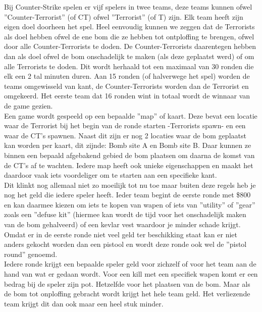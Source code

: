 \documentclass[pdftex,a4paper,12pt,twoside]{report}
\begin{document}
Bij Counter-Strike spelen er vijf spelers in twee teams, deze teams kunnen ofwel ''Counter-Terrorist'' (of CT) ofwel ''Terrorist'' (of T) zijn. Elk team heeft zijn eigen doel doorheen het spel. Heel eenvoudig kunnen we zeggen dat de Terrorists als doel hebben ofwel de ene bom die ze hebben tot ontploffing te brengen, ofwel door alle Counter-Terrorists te doden. 
De Counter-Terrorists daarentegen hebben dan als doel ofwel de bom onschadelijk te maken (als deze geplaatst werd) of om alle Terrorists te doden. Dit wordt herhaald tot een maximaal van 30 ronden die elk een 2 tal minuten duren. Aan 15 ronden (of halverwege het spel) worden de teams omgewisseld van kant, de Counter-Terrorists worden dan de Terrorist en omgekeerd. Het eerste team dat 16 ronden wint in totaal wordt de winnaar van de game gezien.
\\

Een game wordt gespeeld op een bepaalde ''map'' of kaart. Deze bevat een locatie waar de Terrorist bij het begin van de ronde starten -Terrorists spawn- en een waar de CT's spawnen. Naast dit zijn er nog 2 locaties waar de bom geplaatst kan worden per kaart, dit zijnde: Bomb site A en Bomb site B. Daar kunnen ze binnen een bepaald afgebakend gebied de bom plaatsen om daarna de komst van de CT's af te wachten. Iedere map heeft ook unieke eigenschappen en maakt het daardoor vaak iets voordeliger om te starten aan een specifieke kant.
\\

Dit klinkt nog allemaal niet zo moeilijk tot nu toe maar buiten deze regels heb je nog het geld die iedere speler heeft. Ieder team begint de eerste ronde met \$800 en kan daarmee kiezen om iets te kopen van wapen of iets van ''utility'' of ''gear'' zoals een ''defuse kit'' (hiermee kan wordt de tijd voor het onschadelijk maken van de bom gehalveerd) of een kevlar vest waardoor je minder schade krijgt. 
Omdat er in de eerste ronde niet veel geld ter beschikking staat kan er niet anders gekocht worden dan een pistool en wordt deze ronde ook wel de ''pistol round'' genoemd.
\\

Iedere ronde krijgt een bepaalde speler geld voor zichzelf of voor het team aan de hand van wat er gedaan wordt. Voor een kill met een specifiek wapen komt er een bedrag bij de speler zijn pot. Hetzelfde voor het plaatsen van de bom. Maar als de bom tot onploffing gebracht wordt krijgt het hele team geld. Het verliezende team krijgt dit dan ook maar een heel stuk minder.
\\
\end{document}
